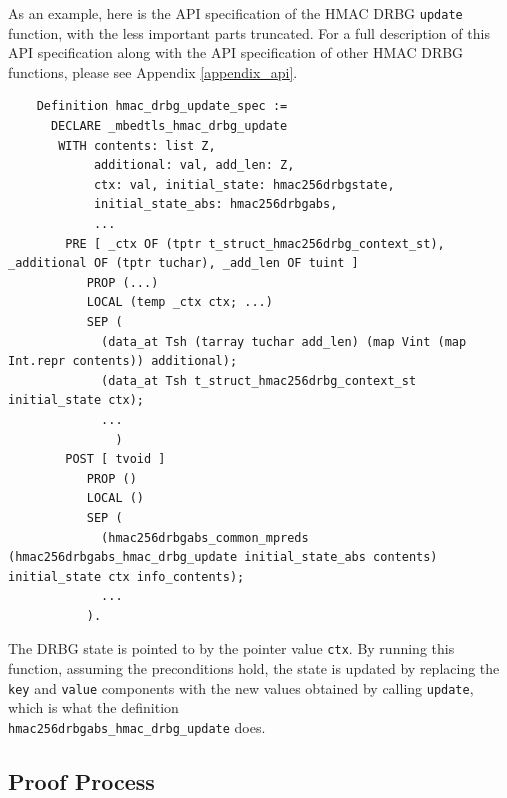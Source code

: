 \documentclass[pageno]{jpaper}
\begin{document}
As an example, here is the API specification of the HMAC DRBG \lstinline{update} function, with the less important parts truncated. For a full description of this API specification along with the API specification of other HMAC DRBG functions, please see Appendix \ref{appendix_api}.

\begin{lstlisting}
    Definition hmac_drbg_update_spec :=
      DECLARE _mbedtls_hmac_drbg_update
       WITH contents: list Z,
            additional: val, add_len: Z,
            ctx: val, initial_state: hmac256drbgstate,
            initial_state_abs: hmac256drbgabs,
            ...
        PRE [ _ctx OF (tptr t_struct_hmac256drbg_context_st), _additional OF (tptr tuchar), _add_len OF tuint ]
           PROP (...)
           LOCAL (temp _ctx ctx; ...)
           SEP (
             (data_at Tsh (tarray tuchar add_len) (map Vint (map Int.repr contents)) additional);
             (data_at Tsh t_struct_hmac256drbg_context_st initial_state ctx);
             ...
               )
        POST [ tvoid ]
           PROP ()
           LOCAL ()
           SEP (
             (hmac256drbgabs_common_mpreds (hmac256drbgabs_hmac_drbg_update initial_state_abs contents) initial_state ctx info_contents);
             ...
           ).
\end{lstlisting}

The DRBG state is pointed to by the pointer value \lstinline{ctx}. By running this function, assuming the preconditions hold, the state is updated by replacing the \lstinline{key} and \lstinline{value} components with the new values obtained by calling \lstinline{update}, which is what the definition \\ \lstinline{hmac256drbgabs_hmac_drbg_update} does.

\subsection{Proof Process}
\end{document}
